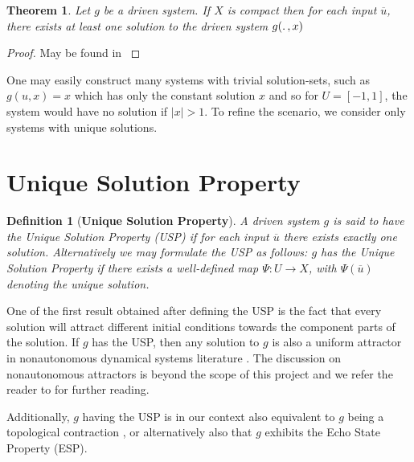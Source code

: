 \documentclass[a4paper,12pt,twoside]{report}
\newtheorem{Definition}{Definition}[]
\newtheorem{Theorem}{Theorem}[]
\begin{document}
\begin{Theorem}\label{Thm_CompactExistence}
 Let $g$ be a driven system.  If $X$ is compact then for each input $\overline{u}$, there exists at least one solution to the driven system $g(\ldotp, x)$
\end{Theorem}
\begin{proof}
  May be found in \cite{kloeden2011nonautonomous, manjunath2014dynamics, manjunath2013echo}
\end{proof}

One may easily construct many systems with trivial solution-sets, such as $g(u,x)=x$ which has only the constant solution $x$ and so for $U=[-1,1]$, the system would have no solution if $|x|>1$. To refine the scenario, we consider only systems with unique solutions. 

\section{Unique Solution Property}

\begin{Definition}
  [\bf Unique Solution Property] \label{Dfn_usp}\rm
  A driven system $g$ is said to have the Unique Solution Property (USP) if for each input $\overline{u}$ there exists exactly one solution. 
  Alternatively we may formulate the USP as follows: $g$ has the Unique Solution Property if there exists a well-defined map $\Psi:{U}\to{X}$, with $\Psi({\overline{u}})$ denoting the unique solution.
\end{Definition}

One of the first result obtained after defining the USP is the fact that every solution will attract different initial conditions towards the component parts of the solution. %
If $g$ has the USP, then any solution to $g$ is also a uniform attractor in nonautonomous dynamical systems literature \cite{Manju_Nonlinearity}. The discussion on nonautonomous attractors is beyond the scope of this project and we refer the reader to \cite{Manju_ESP, esann2012ids} for further reading. 

Additionally, $g$ having the USP is in our context also equivalent to $g$ being a topological contraction \cite{manjunath2021universal}, or alternatively also that $g$ exhibits the Echo State Property (ESP). 
\end{document}
